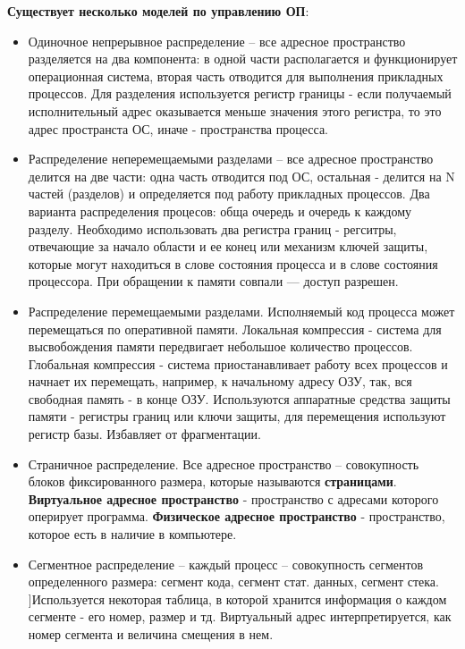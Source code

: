 \textbf{Существует несколько моделей по управлению ОП}:
\begin{itemize}
    \item Одиночное непрерывное распределение -- все адресное пространство разделяется на два компонента: в одной части располагается и функционирует операционная система, вторая часть отводится для выполнения прикладных процессов. Для разделения используется регистр границы - если получаемый исполнительный адрес оказывается меньше значения этого регистра, то это адрес пространста ОС, иначе - пространства процесса.
    \item Распределение неперемещаемыми разделами -- все адресное пространство делится на две части: одна часть отводится под ОС, остальная - делится на N частей (разделов) и определяется под работу прикладных процессов. Два варианта распределения процесов: обща очередь и очередь к каждому разделу. Необходимо использовать два регистра границ - регситры, отвечающие за начало области и ее конец или механизм ключей защиты, которые могут находиться в слове состояния процесса и в слове состояния процессора. При обращении к памяти совпали — доступ разрешен.
    \item Распределение перемещаемыми разделами. Исполняемый код процесса может перемещаться по оперативной памяти. Локальная компрессия - система для высвобождения памяти передвигает небольшое количество процессов. Глобальная компрессия - система приостанавливает работу всех процессов и начнает их перемещать, например,  к начальному адресу ОЗУ, так, вся свободная память - в конце ОЗУ. Используются аппаратные средства защиты памяти - регистры границ или ключи защиты, для перемещения используют регистр базы. Избавляет от фрагментации.
    \item Страничное распределение. Все адресное пространство -- совокупность блоков фиксированного размера, которые называются \textbf{страницами}. \textbf{Виртуальное адресное пространство} - пространство с адресами которого оперирует программа. \textbf{Физическое адресное пространство} - пространство, которое есть в наличие в компьютере.
    \item Сегментное распределение -- каждый процесс -- совокупность сегментов определенного размера: сегмент кода, сегмент стат. данных, сегмент стека. ]Используется некоторая таблица, в которой хранится информация о каждом сегменте - его номер, размер и тд. Виртуальный адрес интерпретируется, как номер сегмента и величина смещения в нем.
\end{itemize}

